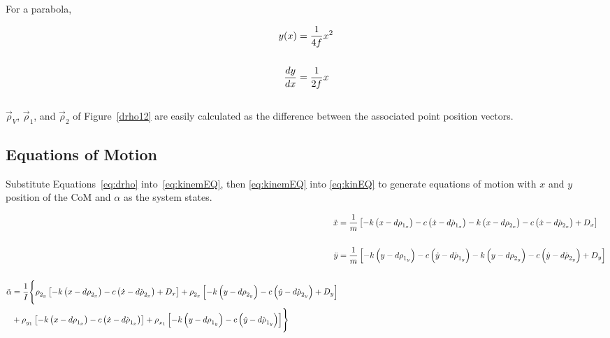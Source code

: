 For a parabola,

\begin{equation}
\label{parabola}
\centering
\begin{aligned}
	y(x) &= \frac{1}{4f}x^2 \\
	\\
	\frac{dy}{dx} &= \frac{1}{2f}x
\end{aligned}
\end{equation}\\

$\vec{\rho}_V$, $\vec{\rho}_1$, and $\vec{\rho}_2$ of Figure~\ref{drho12} are easily calculated as the difference between the associated point position vectors.

\subsection*{Equations of Motion}

Substitute Equations~\eqref{eq:drho} into~\eqref{eq:kinemEQ}, then \eqref{eq:kinemEQ} into \eqref{eq:kinEQ} to generate equations of motion with $x$ and $y$ position of the CoM and $\alpha$ as the system states.

\begin{subequations}
\label{eq:fullEoM}
\centering
\begin{align}
	\ddot{x} &= \frac{1}{m}\left[-k\left(x - d\rho_{1_x}\right) -c\left(\dot{x} - d\dot{\rho}_{1_x}\right) - k\left(x - d\rho_{2_x}\right) -c\left(\dot{x} - d\dot{\rho}_{2_x}\right) + D_x \right]\\
	\nonumber \\
	\ddot{y} &= \frac{1}{m}\left[-k\left(y - d\rho_{1_y}\right) -c\left(\dot{y} - d\dot{\rho}_{1_y}\right) - k\left(y - d\rho_{2_y}\right) -c\left(\dot{y} - d\dot{\rho}_{2_y}\right) + D_y \right] \\
	\nonumber \\
	\begin{split}
	\ddot{\alpha} &= \frac{1}{I} \Biggl\{ \rho_{2_y}\left[-k\left(x - d\rho_{2_x}\right) - c\left(\dot{x} - d\dot{\rho}_{2_x}\right)+D_x\right] +  
													 \rho_{2_x}\left[-k\left(y - d\rho_{2_y}\right) - c\left(\dot{y} - d\dot{\rho}_{2_y}\right)+D_y\right]  \\
						&					  + \rho_{y_1}\left[-k\left(x - d\rho_{1_x}\right) - c\left(\dot{x} - d\dot{\rho}_{1_x}\right)\right] + 
													 \rho_{x_1}\left[-k\left(y - d\rho_{1_y}\right)  - c\left(\dot{y} - d\dot{\rho}_{1_y}\right)\right]  \Biggr\}
	\end{split}
\end{align}
\end{subequations}
